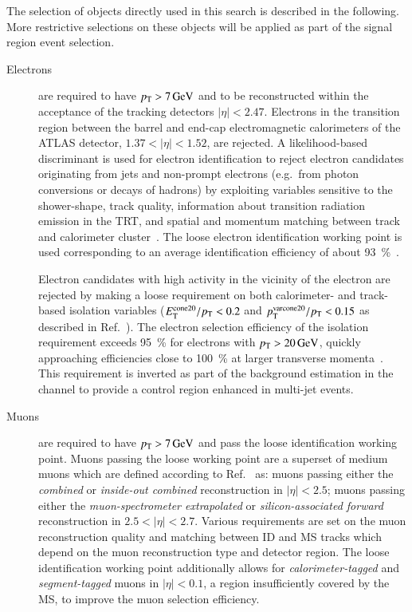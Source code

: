 The selection of objects directly used in this search is described in
the following. More restrictive selections on these objects will be
applied as part of the signal region event selection.
\begin{description}

\item[Electrons] are required to have $\pT > \SI{7}{\GeV}$ and to be
  reconstructed within the acceptance of the tracking detectors
  $|\eta| < \num{2.47}$. Electrons in the transition region between
  the barrel and end-cap electromagnetic calorimeters of the ATLAS
  detector, $1.37 < |\eta| < 1.52$, are rejected. A likelihood-based
  discriminant is used for electron identification to reject electron
  candidates originating from jets and non-prompt electrons (e.g.\
  from photon conversions or decays of hadrons) by exploiting
  variables sensitive to the shower-shape, track quality, information
  about transition radiation emission in the TRT, and spatial and
  momentum matching between track and calorimeter
  cluster~\cite{EGAM-2018-01}. The loose electron identification
  working point is used corresponding to an average identification
  efficiency of about \SI{93}{\percent}~\cite{EGAM-2018-01}.

  Electron candidates with high activity in the vicinity of the
  electron are rejected by making a loose requirement on both
  calorimeter- and track-based isolation variables
  ($E_{\text{T}}^\text{cone20} / p_{\text{T}} < 0.2$ and
  $p_{\text{T}}^{\text{varcone20}}/ p_{\text{T}} < 0.15$ as described in
  Ref.~\cite{EGAM-2018-01}). The electron selection efficiency of the
  isolation requirement exceeds \SI{95}{\percent} for electrons with
  $\pT > \SI{20}{\GeV}$, quickly approaching efficiencies close to
  \SI{100}{\percent} at larger transverse
  momenta~\cite{EGAM-2018-01}. This requirement is inverted as part of
  the \faketauhadvis background estimation in the \lephad channel to
  provide a control region enhanced in multi-jet events.



\item[Muons] are required to have $\pT > \SI{7}{\GeV}$ and pass the
  loose identification working point. Muons passing the loose working
  point are a superset of medium muons which are defined according to
  Ref.~\cite{MUON-2018-03} as: muons passing either the
  \emph{combined} or \emph{inside-out combined} reconstruction in
  $|\eta| < 2.5$; muons passing either the \emph{muon-spectrometer
    extrapolated} or \emph{silicon-associated forward} reconstruction
  in $2.5 < |\eta| < 2.7$. Various requirements are set on the muon
  reconstruction quality and matching between ID and MS tracks which
  depend on the muon reconstruction type and detector region. The
  loose identification working point additionally allows for
  \emph{calorimeter-tagged} and \emph{segment-tagged} muons in
  $|\eta| < 0.1$, a region insufficiently covered by the MS, to
  improve the muon selection efficiency.


\end{description}
